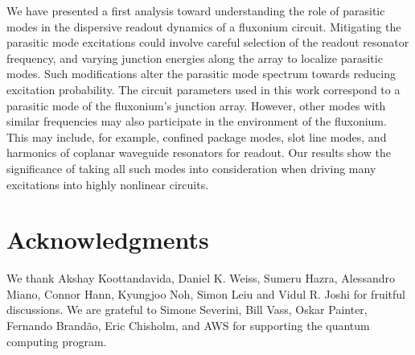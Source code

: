 \documentclass[%
reprint,
superscriptaddress,
 amsmath,amssymb,
 aps,
 prx,
longbibliography,
floatfix,
]{revtex4-2}
\begin{document}

We have presented a first analysis toward understanding the role of parasitic modes in the dispersive readout dynamics of a fluxonium circuit. Mitigating the parasitic mode excitations could involve careful selection of the readout resonator frequency, and varying junction energies along the array to localize parasitic modes. Such modifications alter the parasitic mode spectrum towards reducing excitation probability. The circuit parameters used in this work correspond to a parasitic mode of the fluxonium's junction array. However, other modes with similar frequencies may also participate in the environment of the fluxonium. This may include, for example, confined package modes, slot line modes, and harmonics of coplanar waveguide resonators for readout. Our results show the significance of taking all such modes into consideration when driving many excitations into highly nonlinear circuits.  

\section{Acknowledgments}
 We thank Akshay Koottandavida, Daniel K. Weiss, Sumeru Hazra, Alessandro Miano, Connor Hann, Kyungjoo Noh, Simon Leiu and Vidul R. Joshi for fruitful discussions. We are grateful to Simone Severini, Bill Vass, Oskar Painter, Fernando Brand\~ao, Eric Chisholm, and AWS for supporting the quantum computing program. %
\appendix
\end{document}
